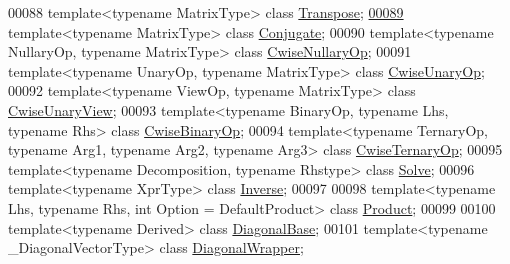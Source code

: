 \begin{DoxyCode}
00088 \textcolor{keyword}{template}<\textcolor{keyword}{typename} MatrixType> \textcolor{keyword}{class }\hyperlink{group___core___module_class_eigen_1_1_transpose}{Transpose};
\hyperlink{class_eigen_1_1_conjugate}{00089} \textcolor{keyword}{template}<\textcolor{keyword}{typename} MatrixType> \textcolor{keyword}{class }\hyperlink{class_eigen_1_1_conjugate}{Conjugate};
00090 \textcolor{keyword}{template}<\textcolor{keyword}{typename} NullaryOp, \textcolor{keyword}{typename} MatrixType>         \textcolor{keyword}{class }\hyperlink{group___core___module_class_eigen_1_1_cwise_nullary_op}{CwiseNullaryOp};
00091 \textcolor{keyword}{template}<\textcolor{keyword}{typename} UnaryOp,   \textcolor{keyword}{typename} MatrixType>         \textcolor{keyword}{class }\hyperlink{group___core___module_class_eigen_1_1_cwise_unary_op}{CwiseUnaryOp};
00092 \textcolor{keyword}{template}<\textcolor{keyword}{typename} ViewOp,    \textcolor{keyword}{typename} MatrixType>         \textcolor{keyword}{class }\hyperlink{group___core___module_class_eigen_1_1_cwise_unary_view}{CwiseUnaryView};
00093 \textcolor{keyword}{template}<\textcolor{keyword}{typename} BinaryOp,  \textcolor{keyword}{typename} Lhs, \textcolor{keyword}{typename} Rhs>  \textcolor{keyword}{class }\hyperlink{group___core___module_class_eigen_1_1_cwise_binary_op}{CwiseBinaryOp};
00094 \textcolor{keyword}{template}<\textcolor{keyword}{typename} TernaryOp, \textcolor{keyword}{typename} Arg1, \textcolor{keyword}{typename} Arg2, \textcolor{keyword}{typename} Arg3>  \textcolor{keyword}{class }
      \hyperlink{group___core___module_class_eigen_1_1_cwise_ternary_op}{CwiseTernaryOp};
00095 \textcolor{keyword}{template}<\textcolor{keyword}{typename} Decomposition, \textcolor{keyword}{typename} Rhstype>        \textcolor{keyword}{class }\hyperlink{group___core___module_class_eigen_1_1_solve}{Solve};
00096 \textcolor{keyword}{template}<\textcolor{keyword}{typename} XprType>                                \textcolor{keyword}{class }\hyperlink{class_eigen_1_1_inverse}{Inverse};
00097 
00098 \textcolor{keyword}{template}<\textcolor{keyword}{typename} Lhs, \textcolor{keyword}{typename} Rhs, \textcolor{keywordtype}{int} Option = DefaultProduct> \textcolor{keyword}{class }\hyperlink{group___core___module_class_eigen_1_1_product}{Product};
00099 
00100 \textcolor{keyword}{template}<\textcolor{keyword}{typename} Derived> \textcolor{keyword}{class }\hyperlink{class_eigen_1_1_diagonal_base}{DiagonalBase};
00101 \textcolor{keyword}{template}<\textcolor{keyword}{typename} \_DiagonalVectorType> \textcolor{keyword}{class }\hyperlink{group___core___module_class_eigen_1_1_diagonal_wrapper}{DiagonalWrapper};

\end{DoxyCode}
